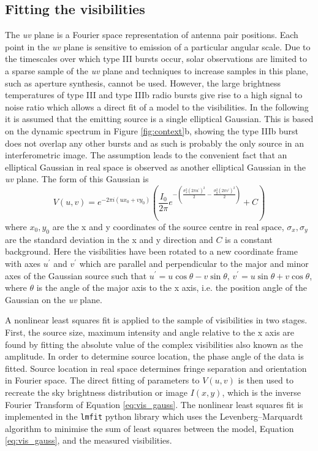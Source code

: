 \subsection{Fitting the visibilities}
\label{sec:vis_fit}
The \textit{uv} plane is a Fourier space representation of antenna pair positions. Each point in the \textit{uv} plane is sensitive to emission of a particular angular scale. Due to the timescales over which type III bursts occur, solar observations are limited to a sparse sample of the \textit{uv} plane and techniques to increase samples in this plane, such as aperture synthesis, cannot be used. However, the large brightness temperatures of type III and type IIIb radio bursts \citep{Reid2014} give rise to a  high signal to noise ratio which allows a direct fit of a model to the visibilities.
In the following it is assumed that the emitting source is a single elliptical Gaussian. This is based on the dynamic spectrum in Figure \ref{fig:context}b, showing the type IIIb burst does not overlap any other bursts and as such is probably the only source in an interferometric image. The assumption leads to the convenient fact that an elliptical Gaussian in real space is observed as another elliptical Gaussian in the \textit{uv} plane. The form of this Gaussian is
\begin{equation}
V(u,v) = e^{-2\pi i(ux_0+vy_0)} \left( \frac{I_0}{2\pi} e^{-\left(\frac{\sigma_x^2(2\pi u^\prime)^2}{2}-\frac{\sigma_y^2(2\pi v^\prime)^2}{2}\right)} + C \right)
\label{eq:vis_gauss}
\end{equation}
where $x_0, y_0$ are the x and y coordinates of the source centre in real space, $\sigma_x, \sigma_y$ are the standard deviation in the x and y direction and $C$ is a constant background. Here the visibilities have been rotated to a new coordinate frame with axes $u^\prime$ and $v^\prime$ which are parallel and perpendicular to the major and minor axes of the Gaussian source such that $u^\prime = u\cos{\theta} - v\sin{\theta} \mbox{, } v^\prime = u\sin{\theta} + v\cos{\theta}$,  where $\theta$ is the angle of the major axis to the x axis, i.e. the position angle of the Gaussian on the \textit{uv} plane.

A nonlinear least squares fit is applied to the sample of visibilities in two stages. First, the source size, maximum intensity and angle relative to the x axis are found by fitting the absolute value of the complex visibilities also known as the amplitude.
In order to determine source location, the phase angle of the data is fitted. Source location in real space determines fringe separation and orientation in Fourier space. The direct fitting of parameters to \textbf{$V(u,v)$} is then used to recreate the sky brightness distribution or image \textbf{$I(x,y)$}, which is the inverse Fourier Transform of Equation \ref{eq:vis_gauss}. The nonlinear least squares fit is implemented in the \texttt{lmfit} python library \citep{Newville2014} which uses the Levenberg–Marquardt algorithm to minimise the sum of least squares between the model, Equation \ref{eq:vis_gauss}, and the measured visibilities.


